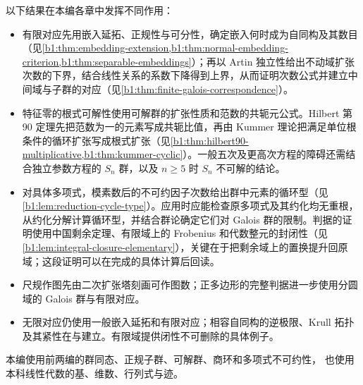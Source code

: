 \ProseParagraphBreak
以下结果在本编各章中发挥不同作用：
\begin{itemize}
	\item 有限对应先用嵌入延拓、正规性与可分性，确定嵌入何时成为自同构及其数目（见\cref{b1:thm:embedding-extension,b1:thm:normal-embedding-criterion,b1:thm:separable-embeddings}）；再以 Artin 独立性给出不动域扩张次数的下界，结合线性关系的系数下降得到上界，从而证明次数公式并建立中间域与子群的对应（见\cref{b1:thm:finite-galois-correspondence}）。
	\item 特征零的根式可解性使用可解群的扩张性质和范数的共轭元公式。Hilbert 第 90 定理先把范数为一的元素写成共轭比值，再由 Kummer 理论把满足单位根条件的循环扩张写成根式扩张（见\cref{b1:thm:hilbert90-multiplicative,b1:thm:kummer-cyclic}）。一般五次及更高次方程的障碍还需结合独立参数方程的 \(S_n\) 群，以及 \(n\geq5\) 时 \(S_n\) 不可解的结论。
	\item 对具体多项式，模素数后的不可约因子次数给出群中元素的循环型（见\cref{b1:lem:reduction-cycle-type}）。应用时应能检查原多项式及其约化均无重根，从约化分解计算循环型，并结合群论确定它们对 Galois 群的限制。判据的证明使用中国剩余定理、有限域上的 Frobenius 和代数整元的封闭性（见\cref{b1:lem:integral-closure-elementary}），关键在于把剩余域上的置换提升回原域；这段证明可以在完成的具体计算后回读。
	\item 尺规作图先由二次扩张塔刻画可作图数；正多边形的完整判据进一步使用分圆域的 Galois 群与有限对应。
	\item 无限对应仍使用一般嵌入延拓和有限对应；相容自同构的逆极限、Krull 拓扑及其紧性在与建立。有限域提供闭性不可删除的具体例子。
\end{itemize}

本编使用前两编的群同态、正规子群、可解群、商环和多项式不可约性， 也使用本科线性代数的基、维数、行列式与迹。










